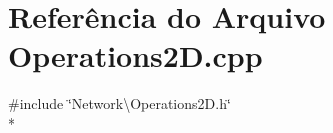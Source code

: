 \section{Referência do Arquivo Operations2\+D.\+cpp}
\label{_operations2_d_8cpp}
{\ttfamily \#include \char`\"{}Network\textbackslash{}\+Operations2\+D.\+h\char`\"{}}\\*
